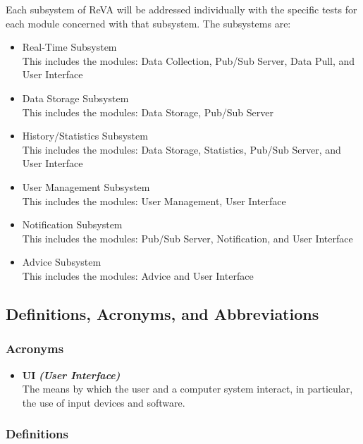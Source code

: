 \documentclass[12pt]{article}
\begin{document}
{		Each subsystem of ReVA will be addressed individually with the specific tests for each module concerned with that subsystem. The subsystems are:
		\begin{itemize}
			\item Real-Time Subsystem \\ This includes the modules: Data Collection,  Pub/Sub Server, Data Pull, and User Interface
			\item Data Storage Subsystem \\ This includes the modules: Data Storage, Pub/Sub Server
			\item History/Statistics Subsystem \\ This includes the modules: Data Storage, Statistics, Pub/Sub Server, and User Interface
			\item User Management Subsystem \\ This includes the modules: User Management, User Interface
			\item Notification Subsystem \\ This includes the modules: Pub/Sub Server, Notification, and User Interface
			\item Advice Subsystem \\ This includes the modules: Advice and User Interface
		\end{itemize}
		\subsection{Definitions, Acronyms, and Abbreviations}


			\subsubsection{Acronyms}

			\begin{itemize}

				\item \textbf{UI} \textbf{\textit{(User Interface)}} \\
				\newline
				The means by which the user and a computer system interact, in particular, the use of input devices and software.

			\end{itemize}

			\subsubsection{Definitions}

}
\end{document}

